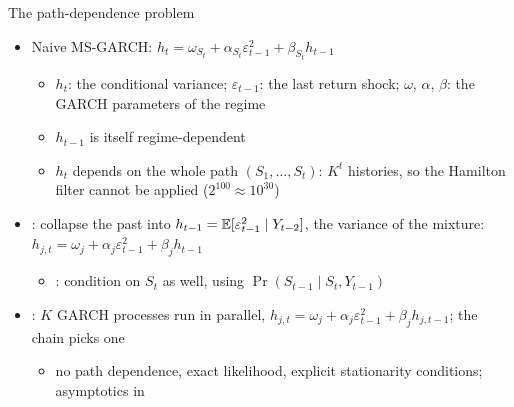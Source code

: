 \begin{frame}{The path-dependence problem}
\itemsize{\small}
\begin{itemize}
    \item Naive MS-GARCH: $h_t = \omega_{S_t} + \alpha_{S_t}\varepsilon_{t-1}^2 + \beta_{S_t}h_{t-1}$
    \begin{itemize}
        \item $h_t$: the conditional variance; $\varepsilon_{t-1}$: the last return shock; $\omega$, $\alpha$, $\beta$: the GARCH parameters of the regime
        \item $h_{t-1}$ is itself regime-dependent
        \item $h_t$ depends on the whole path $(S_1, \dots, S_t)$: $K^t$ histories, so the Hamilton filter cannot be applied ($2^{100} \approx 10^{30}$)
    \end{itemize}
    \item {}: collapse the past into $h_{t-1} = \mathbb{E}[\varepsilon_{t-1}^2 \mid Y_{t-2}]$, the variance of the mixture: $h_{j,t} = \omega_j + \alpha_j\varepsilon_{t-1}^2 + \beta_j h_{t-1}$
    \begin{itemize}
        \item {}: condition on $S_t$ as well, using $\Pr(S_{t-1} \mid S_t, Y_{t-1})$
    \end{itemize}
    \item {}: $K$ GARCH processes run in parallel, $h_{j,t} = \omega_j + \alpha_j\varepsilon_{t-1}^2 + \beta_j h_{j,t-1}$; the chain picks one
    \begin{itemize}
        \item no path dependence, exact likelihood, explicit stationarity conditions; asymptotics in 
    \end{itemize}
\end{itemize}
\end{frame}

